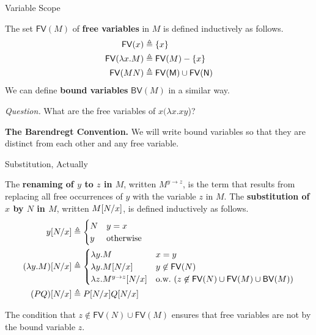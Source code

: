 \documentclass[10pt]{beamer}
\begin{document}
\begin{frame}{Variable Scope}

\begin{definition}
The set $\mathsf{FV}(M)$ of \textbf{free variables} in $M$ is defined inductively as follows.
\begin{align*}
\mathsf{FV}(x) &\triangleq \{x\} \\
\mathsf{FV}(\lambda x . M) &\triangleq \mathsf{FV}(M) - \{x\} \\
\mathsf{FV}(MN) &\triangleq \mathsf{FV(M)} \cup \mathsf{FV(N)}
\end{align*}
We can define \textbf{bound variables} $\mathsf{BV}(M)$ in a similar way.
\end{definition}
\nxt

\textit{Question.} What are the free variables of $x(\lambda x. x y$)?
\nxt

\textbf{The Barendregt Convention.} We will write bound variables so that they are distinct from each other and any free variable.

\end{frame}

\begin{frame}{Substitution, Actually}

\begin{definition}
The \textbf{renaming of $y$ to $z$ in $M$}, written $M^{y \to z}$, is the term that results from replacing all free occurrences of $y$ with the variable $z$ in $M$.
The \textbf{substitution of $x$ by $N$ in $M$}, written $M[N/x]$, is defined inductively as follows.
\begin{align*}
y[N/x] &\triangleq
\begin{cases}
  N & y = x \\
  y & \textnormal{otherwise}
\end{cases} \\
(\lambda y . M)[N/x] &\triangleq
\begin{cases}
\lambda y . M & x = y \\
\lambda y . M[N/x] & y \not \in \mathsf{FV}(N) \\
\lambda z . M^{y \to z}[N/x] & \text{o.w.} \ (z \not \in \mathsf{FV}(N) \cup \mathsf{FV}(M) \cup \mathsf{BV}(M)) \\
\end{cases} \\
(PQ)[N/x] &\triangleq P[N/x]Q[N/x]
\end{align*}
\end{definition}

The condition that $z \not \in \mathsf{FV}(N) \cup \mathsf{FV}(M)$ ensures that free variables are not  by the bound variable $z$.
\end{frame}
\end{document}
